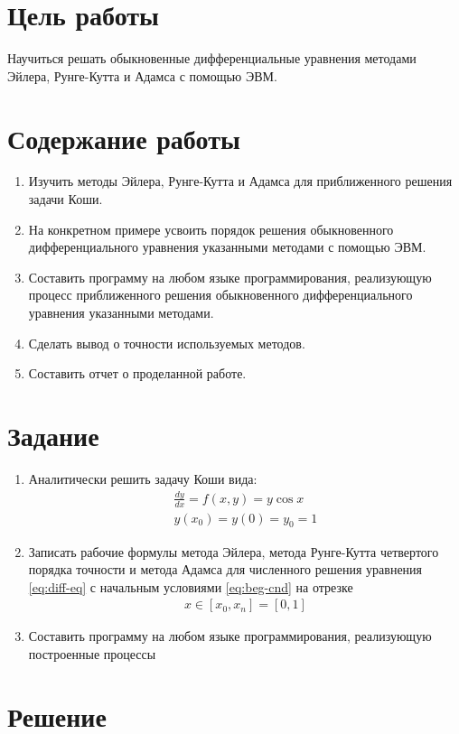 \section{Цель работы}
Научиться решать обыкновенные дифференциальные уравнения методами Эйлера, Рунге-Кутта и Адамса с помощью ЭВМ.

\section{Содержание работы}
\begin{enumerate}
	\item Изучить методы Эйлера, Рунге-Кутта и Адамса для приближенного решения задачи Коши.
	\item На конкретном примере усвоить порядок решения обыкновенного дифференциального уравнения указанными методами с помощью ЭВМ.
	\item Составить программу на любом языке программирования, реализующую процесс приближенного решения обыкновенного дифференциального уравнения указанными методами.
	\item Сделать вывод о точности используемых методов.
	\item Составить отчет о проделанной работе.
\end{enumerate}

\section{Задание}
\begin{enumerate}
	\item Аналитически решить задачу Коши вида:
	      \begin{align}
		      \label{eq:diff-eq}
		      \frac{dy}{dx} = f(x, y) = y \cos x \\
		      \label{eq:beg-cnd}
		      y(x_0) = y(0) = y_0 = 1
	      \end{align}
	\item Записать рабочие формулы метода Эйлера, метода Рунге-Кутта четвертого порядка точности и метода Адамса для численного решения уравнения \cref{eq:diff-eq} с начальным условиями \cref{eq:beg-cnd} на отрезке
	      \begin{align}\label{eq:x-src}
		      x \in [x_0, x_n] = [0, 1]
	      \end{align}
	\item Составить программу на любом языке программирования, реализующую построенные процессы
\end{enumerate}
\section{Решение}
